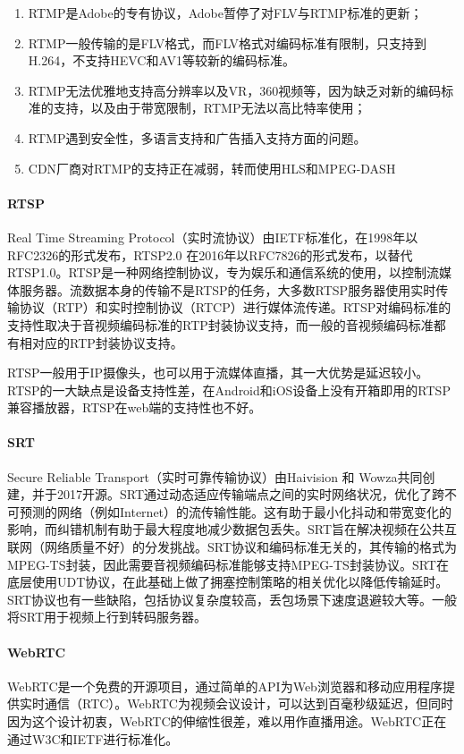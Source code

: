 \begin{enumerate} [label=\arabic*)]
    \item RTMP是Adobe的专有协议，Adobe暂停了对FLV与RTMP标准的更新；
    \item RTMP一般传输的是FLV格式，而FLV格式对编码标准有限制，只支持到H.264，不支持HEVC和AV1等较新的编码标准。
    \item RTMP无法优雅地支持高分辨率以及VR，360视频等，因为缺乏对新的编码标准的支持，以及由于带宽限制，RTMP无法以高比特率使用；
    \item RTMP遇到安全性，多语言支持和广告插入支持方面的问题。
    \item CDN厂商对RTMP的支持正在减弱，转而使用HLS和MPEG-DASH
\end{enumerate}

\paragraph{RTSP} Real Time Streaming Protocol（实时流协议）由IETF标准化，在1998年以RFC2326的形式发布，RTSP2.0 在2016年以RFC7826的形式发布，以替代RTSP1.0。RTSP是一种网络控制协议，专为娱乐和通信系统的使用，以控制流媒体服务器。流数据本身的传输不是RTSP的任务，大多数RTSP服务器使用实时传输协议（RTP）和实时控制协议（RTCP）进行媒体流传递。RTSP对编码标准的支持性取决于音视频编码标准的RTP封装协议支持，而一般的音视频编码标准都有相对应的RTP封装协议支持。

RTSP一般用于IP摄像头，也可以用于流媒体直播，其一大优势是延迟较小。RTSP的一大缺点是设备支持性差，在Android和iOS设备上没有开箱即用的RTSP兼容播放器，RTSP在web端的支持性也不好。

\paragraph{SRT} Secure Reliable Transport（实时可靠传输协议）由Haivision 和 Wowza共同创建，并于2017开源。SRT通过动态适应传输端点之间的实时网络状况，优化了跨不可预测的网络（例如Internet）的流传输性能。这有助于最小化抖动和带宽变化的影响，而纠错机制有助于最大程度地减少数据包丢失。SRT旨在解决视频在公共互联网（网络质量不好）的分发挑战。SRT协议和编码标准无关的，其传输的格式为MPEG-TS封装，因此需要音视频编码标准能够支持MPEG-TS封装协议。SRT在底层使用UDT协议，在此基础上做了拥塞控制策略的相关优化以降低传输延时。SRT协议也有一些缺陷，包括协议复杂度较高，丢包场景下速度退避较大等。一般将SRT用于视频上行到转码服务器。

\paragraph{WebRTC} WebRTC是一个免费的开源项目，通过简单的API为Web浏览器和移动应用程序提供实时通信（RTC）。WebRTC为视频会议设计，可以达到百毫秒级延迟，但同时因为这个设计初衷，WebRTC的伸缩性很差，难以用作直播用途。WebRTC正在通过W3C和IETF进行标准化。

